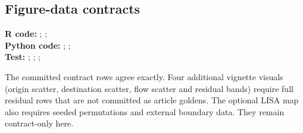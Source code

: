 \documentclass[10pt]{article}
\begin{document}
\subsection{Figure-data contracts}
{\footnotesize \textbf{R code:} ; ; \\ \textbf{Python code:} ; ; \\ \textbf{Test:} ; ; ; \par}

The committed contract rows agree exactly. Four additional vignette visuals (origin scatter, destination scatter, flow scatter and residual bands) require full residual rows that are not committed as article goldens. The optional LISA map also requires seeded permutations and external boundary data. They remain contract-only here.
\end{document}
